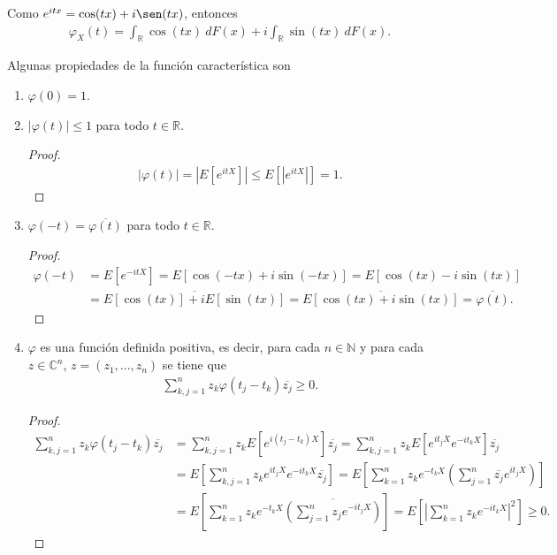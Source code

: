 \begin{obs}
    Como $e^{itx} = \cos(tx) + i \sen(tx)$, entonces
    \begin{align*}
        \varphi_X(t) = \int_{\mathbb{R}} \cos(tx) \ dF(x) + i \int_{\mathbb{R}} \sin(tx) \ dF(x).
    \end{align*}
\end{obs}
Algunas propiedades de la función característica son
\begin{enumerate}
    \item $\varphi(0) = 1$.
    \item $|\varphi(t)| \leq 1$ para todo $t \in \mathbb{R}$.
          \begin{proof}
              \begin{align*}
                  |\varphi(t)| = \left|E \left[ e^{itX} \right] \right| \leq E \left[ \left| e^{itX} \right| \right] = 1.
              \end{align*}
          \end{proof}
    \item $\varphi(-t) = \overline{\varphi(t)}$ para todo $t \in \mathbb{R}$.
          \begin{proof}
              \begin{align*}
                  \varphi(-t) & = E \left[ e^{-itX} \right] = E[\cos(-tx) + i\sin(-tx)] = E[\cos(tx) - i\sin(tx)]                     \\
                              & = \overline{E[\cos(tx)] + iE[\sin(tx)]} = \overline{E[\cos(tx) + i\sin(tx)]} = \overline{\varphi(t)}.
              \end{align*}
          \end{proof}
    \item $\varphi$ es una función definida positiva, es decir, para cada $n \in \mathbb{N}$ y para cada $z \in \mathbb{C}^n$, $z = (z_1,...,z_n)$ se tiene que
          \begin{align*}
              \sum_{k,j=1}^{n} z_k \varphi(t_j-t_k)\overline{z_j} \ge 0.
          \end{align*}
          \begin{proof}
              \begin{align*}
                  \sum_{k,j=1}^{n} z_k \varphi(t_j-t_k)\overline{z_j} & =\sum_{k,j=1}^{n} z_k E\left[ e^{i(t_j-t_k)X} \right]\overline{z_j} = \sum_{k,j=1}^{n} z_k E\left[ e^{it_jX}e^{-it_kX} \right]\overline{z_j}                                     \\
                                                                      & = E \left[ \sum_{k,j=1}^{n} z_k e^{it_jX}e^{-it_kX} \overline{z_j} \right] = E \left[ \sum_{k=1}^{n} z_k e^{-t_kX} \left( \sum_{j=1}^{n} \overline{z_j} e^{it_jX} \right)\right] \\
                                                                      & = E \left[ \sum_{k=1}^{n} z_k e^{-t_kX} \overline{ \left( \sum_{j=1}^{n} z_j e^{-it_jX} \right)}\right] = E \left[ \left| \sum_{k=1}^{n} z_k e^{-it_kX} \right|^2 \right] \ge 0.
              \end{align*}
          \end{proof}
\end{enumerate}

